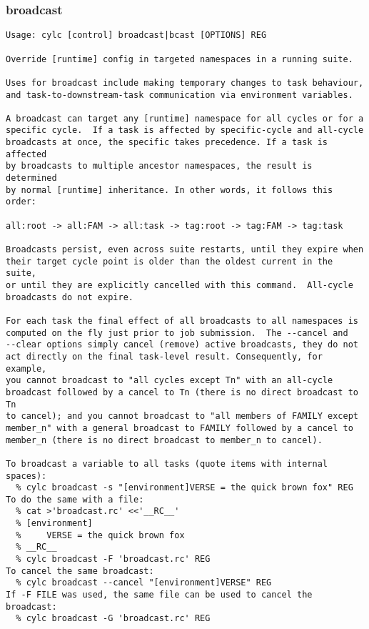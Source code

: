 \subsubsection{broadcast}
\label{broadcast}
\begin{lstlisting}
Usage: cylc [control] broadcast|bcast [OPTIONS] REG

Override [runtime] config in targeted namespaces in a running suite.

Uses for broadcast include making temporary changes to task behaviour,
and task-to-downstream-task communication via environment variables.

A broadcast can target any [runtime] namespace for all cycles or for a
specific cycle.  If a task is affected by specific-cycle and all-cycle
broadcasts at once, the specific takes precedence. If a task is affected
by broadcasts to multiple ancestor namespaces, the result is determined
by normal [runtime] inheritance. In other words, it follows this order:

all:root -> all:FAM -> all:task -> tag:root -> tag:FAM -> tag:task

Broadcasts persist, even across suite restarts, until they expire when
their target cycle point is older than the oldest current in the suite,
or until they are explicitly cancelled with this command.  All-cycle
broadcasts do not expire.

For each task the final effect of all broadcasts to all namespaces is
computed on the fly just prior to job submission.  The --cancel and
--clear options simply cancel (remove) active broadcasts, they do not
act directly on the final task-level result. Consequently, for example,
you cannot broadcast to "all cycles except Tn" with an all-cycle
broadcast followed by a cancel to Tn (there is no direct broadcast to Tn
to cancel); and you cannot broadcast to "all members of FAMILY except
member_n" with a general broadcast to FAMILY followed by a cancel to
member_n (there is no direct broadcast to member_n to cancel).

To broadcast a variable to all tasks (quote items with internal spaces):
  % cylc broadcast -s "[environment]VERSE = the quick brown fox" REG
To do the same with a file:
  % cat >'broadcast.rc' <<'__RC__'
  % [environment]
  %     VERSE = the quick brown fox
  % __RC__
  % cylc broadcast -F 'broadcast.rc' REG
To cancel the same broadcast:
  % cylc broadcast --cancel "[environment]VERSE" REG
If -F FILE was used, the same file can be used to cancel the broadcast:
  % cylc broadcast -G 'broadcast.rc' REG


\end{lstlisting}
